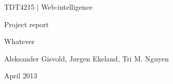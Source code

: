 \begin{titlepage}
\begin{center}
\vspace*{1in}
{\LARGE TDT4215 | Web-intelligence}
\par
\vspace{1in}
{\LARGE Project report}
\par
\vspace{1in}
{\LARGE Whatever}
\par
\vfill
\par
\vspace{0.5in}
Aleksander Gisvold, Jørgen Ekeland, Tri M. Nguyen
\par
April 2013
\end{center}
\end{titlepage}

